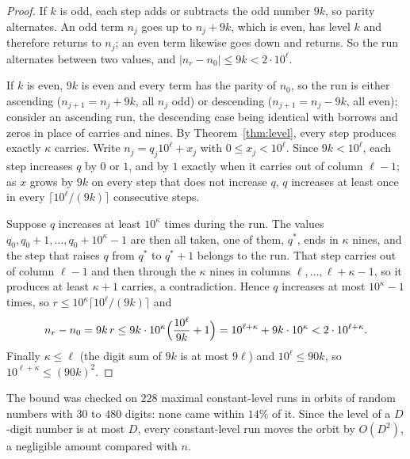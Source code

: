 \documentclass[11pt]{article}
\theoremstyle{definition}
\theoremstyle{remark}
\begin{document}
\begin{proof}
If $k$ is odd, each step adds or subtracts the odd number $9k$, so parity
alternates. An odd term $n_j$ goes up to $n_j+9k$, which is even, has level
$k$ and therefore returns to $n_j$; an even term likewise goes down and
returns. So the run alternates between two values, and
$|n_r-n_0|\le9k<2\cdot10^{\ell}$.

If $k$ is even, $9k$ is even and every term has the parity of $n_0$, so the
run is either ascending
($n_{j+1}=n_j+9k$, all $n_j$ odd) or descending ($n_{j+1}=n_j-9k$, all even);
consider an ascending run, the descending case being identical with borrows
and zeros in place of carries and nines. By Theorem~\ref{thm:level}, every step
produces exactly $\kappa$ carries. Write $n_j=q_j10^\ell+x_j$ with
$0\le x_j<10^\ell$. Since $9k<10^\ell$, each step increases $q$ by $0$ or $1$,
and by $1$ exactly when it carries out of column $\ell-1$; as $x$ grows by $9k$
on every step that does not increase $q$, $q$ increases at least once in every
$\lceil10^\ell/(9k)\rceil$ consecutive steps.

Suppose $q$ increases at least $10^\kappa$ times during the run. The values
$q_0,q_0+1,\dots,q_0+10^\kappa-1$ are then all taken, one of them, $q^*$, ends in
$\kappa$ nines, and the step that raises $q$ from $q^*$ to $q^*+1$ belongs to the
run. That step carries out of column $\ell-1$ and then through the $\kappa$
nines in columns $\ell,\dots,\ell+\kappa-1$, so it produces at least $\kappa+1$
carries, a contradiction. Hence $q$ increases at most $10^\kappa-1$ times, so
$r\le10^\kappa\lceil10^\ell/(9k)\rceil$ and
\[
  n_r-n_0=9k\,r\le9k\cdot10^\kappa\Bigl(\frac{10^\ell}{9k}+1\Bigr)
  =10^{\ell+\kappa}+9k\cdot10^\kappa<2\cdot10^{\ell+\kappa}.
\]
Finally $\kappa\le\ell$ (the digit sum of $9k$ is at most $9\ell$) and
$10^\ell\le90k$, so $10^{\ell+\kappa}\le(90k)^2$.
\end{proof}

The bound was checked on $228$ maximal constant-level runs in orbits of random
numbers with $30$ to $480$ digits: none came within $14\%$ of it. Since the
level of a $D$-digit number is at most $D$, every constant-level run moves the
orbit by $O(D^2)$, a negligible amount compared with $n$.
\end{document}
